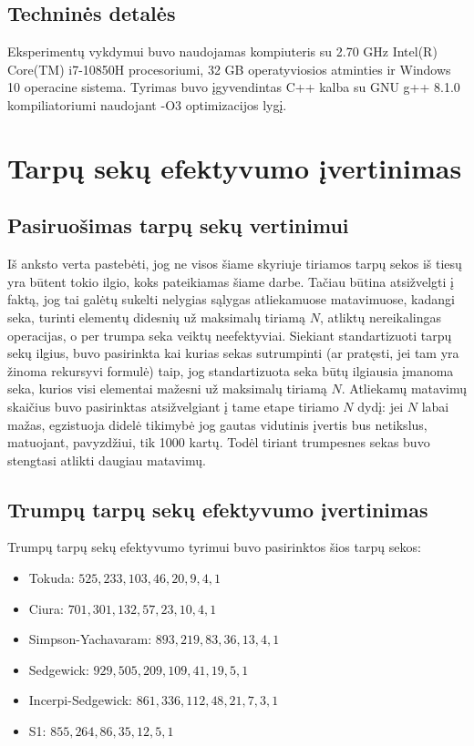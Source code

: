 \documentclass{VUMIFInfKursinis}
\begin{document}
\subsection{Techninės detalės}
Eksperimentų vykdymui buvo naudojamas kompiuteris su 2.70 GHz Intel(R) Core(TM) i7-10850H procesoriumi,
32 GB operatyviosios atminties ir Windows 10 operacine sistema.
Tyrimas buvo įgyvendintas C++ kalba su GNU g++ 8.1.0 kompiliatoriumi naudojant -O3 optimizacijos lygį.

\section{Tarpų sekų efektyvumo įvertinimas}

\subsection{Pasiruošimas tarpų sekų vertinimui}

Iš anksto verta pastebėti, jog ne visos šiame skyriuje tiriamos tarpų sekos iš tiesų yra būtent tokio ilgio, koks pateikiamas šiame darbe.
Tačiau būtina atsižvelgti į faktą, jog tai galėtų sukelti nelygias sąlygas atliekamuose matavimuose,
kadangi seka, turinti elementų didesnių už maksimalų tiriamą $N$, atliktų nereikalingas operacijas, o per trumpa seka veiktų neefektyviai.
Siekiant standartizuoti tarpų sekų ilgius, buvo pasirinkta kai kurias sekas sutrumpinti (ar pratęsti, jei tam yra žinoma rekursyvi formulė)
taip, jog standartizuota seka būtų ilgiausia įmanoma seka, kurios visi elementai mažesni už maksimalų tiriamą $N$.
Atliekamų matavimų skaičius buvo pasirinktas atsižvelgiant į tame etape tiriamo $N$ dydį: jei $N$ labai mažas,
egzistuoja didelė tikimybė jog gautas vidutinis įvertis bus netikslus, matuojant, pavyzdžiui, tik 1000 kartų.
Todėl tiriant trumpesnes sekas buvo stengtasi atlikti daugiau matavimų.

\subsection{Trumpų tarpų sekų efektyvumo įvertinimas}
Trumpų tarpų sekų efektyvumo tyrimui buvo pasirinktos šios tarpų sekos:
\begin{itemize}
  \item Tokuda: $525, 233, 103, 46, 20, 9, 4, 1$ \cite{10.5555/645569.659879}
  \item Ciura: $701, 301, 132, 57, 23, 10, 4, 1$ \cite{ciura2001best}
  \item Simpson-Yachavaram: $893, 219, 83, 36, 13, 4, 1$ \cite{simpson1999faster}
  \item Sedgewick: $929, 505, 209, 109, 41, 19, 5, 1$ \cite{SEDGEWICK1986159}
  \item Incerpi-Sedgewick: $861, 336, 112, 48, 21, 7, 3, 1$ \cite{incerpi1985improved}
  \item S1: $855, 264, 86, 35, 12, 5, 1$
\end{itemize}
\end{document}
